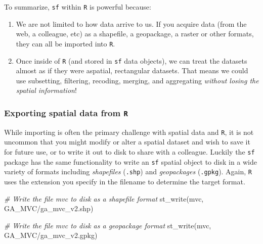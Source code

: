 \documentclass[
]{book}
\newenvironment{Shaded}{\begin{snugshade}}{\end{snugshade}}
\newcommand{\CommentTok}[1]{\textcolor[rgb]{0.56,0.35,0.01}{\textit{#1}}}
\newcommand{\FunctionTok}[1]{\textcolor[rgb]{0.00,0.00,0.00}{#1}}
\newcommand{\NormalTok}[1]{#1}
\newcommand{\StringTok}[1]{\textcolor[rgb]{0.31,0.60,0.02}{#1}}
\providecommand{\tightlist}{%
  \setlength{\itemsep}{0pt}\setlength{\parskip}{0pt}}
\newenvironment{rmdnote}[1]
  {
  \begin{itemize}
  \renewcommand{\labelitemi}{
    \raisebox{-.7\height}[0pt][0pt]{
      {\setkeys{Gin}{width=3em,keepaspectratio}\texttt{[image: images/\#1]}}
    }
  }
  \setlength{\fboxsep}{1em}
  \begin{note}
  \item
  }
  {
  \end{note}
  \end{itemize}
  }
\begin{document}
\begin{rmdnote}{note}

To summarize, \texttt{sf} within \texttt{R} is powerful because:

\begin{enumerate}
\def\labelenumi{\arabic{enumi}.}
\tightlist
\item
  We are not limited to how data arrive to us. If you acquire data (from the web, a colleague, etc) as a shapefile, a geopackage, a raster or other formats, they can all be imported into \texttt{R}.
\item
  Once inside of \texttt{R} (and stored in \texttt{sf} data objects), we can treat the datasets almost as if they were aspatial, rectangular datasets. That means we could use subsetting, filtering, recoding, merging, and aggregating \emph{without losing the spatial information}!
\end{enumerate}

\end{rmdnote}

\hypertarget{exporting-spatial-data-from-r}{%
\subsubsection{\texorpdfstring{Exporting spatial data from \texttt{R}}{Exporting spatial data from R}}\label{exporting-spatial-data-from-r}}

While importing is often the primary challenge with spatial data and \texttt{R}, it is not uncommon that you might modify or alter a spatial dataset and wish to save it for future use, or to write it out to disk to share with a colleague. Luckily the \texttt{sf} package has the same functionality to write an \texttt{sf} spatial object to disk in a wide variety of formats including \emph{shapefiles} (\texttt{.shp}) and \emph{geopackages} (\texttt{.gpkg}). Again, \texttt{R} uses the extension you specify in the filename to determine the target format.

\begin{Shaded}
\begin{Highlighting}[]
\CommentTok{\# Write the file mvc to disk as a shapefile format}
\FunctionTok{st\_write}\NormalTok{(mvc, }\StringTok{\textquotesingle{}GA\_MVC/ga\_mvc\_v2.shp\textquotesingle{}}\NormalTok{)}

\CommentTok{\# Write the file mvc to disk as a geopackage format}
\FunctionTok{st\_write}\NormalTok{(mvc, }\StringTok{\textquotesingle{}GA\_MVC/ga\_mvc\_v2.gpkg\textquotesingle{}}\NormalTok{)}
\end{Highlighting}
\end{Shaded}
\end{document}
